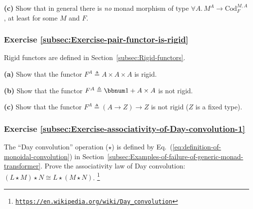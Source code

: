 \textbf{(c)} Show that in general there is \emph{no} monad morphism
of type $\forall A.\,M^{A}\rightarrow\text{Cod}_{F}^{M,A}$, at least
for some $M$ and $F$.

\subsubsection{Exercise \label{subsec:Exercise-pair-functor-is-rigid}\ref{subsec:Exercise-pair-functor-is-rigid}}

Rigid functors are defined in Section~\ref{subsec:Rigid-functors}.

\textbf{(a)} Show that the functor $F^{A}\triangleq A\times A\times A$
is rigid. 

\textbf{(b)} Show that the functor $F^{A}\triangleq\bbnum 1+A\times A$
is not rigid. 

\textbf{(c)} Show that the functor $F^{A}\triangleq\left(A\rightarrow Z\right)\rightarrow Z$
is not rigid ($Z$ is a fixed type).

\subsubsection{Exercise \label{subsec:Exercise-associativity-of-Day-convolution-1}\ref{subsec:Exercise-associativity-of-Day-convolution-1}}

The \textsf{``}Day convolution\textsf{''} operation ($\star$) is defined by Eq.~(\ref{eq:definition-of-monoidal-convolution})
in Section~\ref{subsec:Examples-of-failure-of-generic-monad-transformer}.
Prove the associativity law of Day convolution:
$(L\star M)\star N\cong L\star(M\star N)$. \footnote{\texttt{\href{https://en.wikipedia.org/wiki/Day_convolution}{https://en.wikipedia.org/wiki/Day\_convolution}}}

